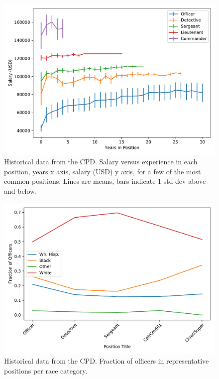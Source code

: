 \begin{figure}[h] 
\includegraphics[width=\textwidth]{figs/salary} 
\caption{Historical data from the CPD. Salary versus experience in each
position, years x axis, salary (USD) y axis, for a few of the most common
positions. Lines are means, bars indicate 1 std dev above and below.} \label{fig:salary}
\end{figure}

\begin{figure}[h] 
\includegraphics[width=\textwidth]{figs/position_race} 
\caption{Historical data from the CPD. Fraction of officers in representative positions 
per race category.} \label{fig:salary}
\end{figure}

